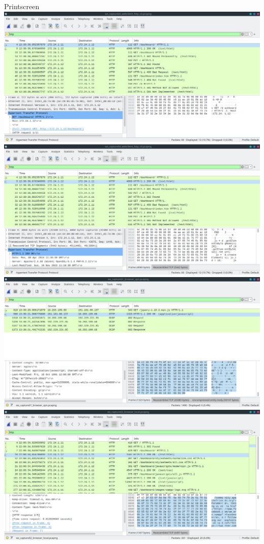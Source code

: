 \documentclass[11pt,a4paper]{report}
\begin{document}
        Printscreen
        \includegraphics[scale=0.3]{wscapwcsocket05} %
        \includegraphics[scale=0.3]{wscapwcsocket06} %
        \includegraphics[scale=0.3]{wscapwcsocket07} %
        \includegraphics[scale=0.3]{wscapwcsocket08} %
\end{document}
